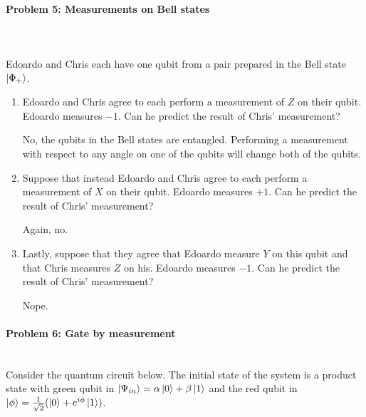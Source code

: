 \documentclass[12pt]{article}
\newcommand{\rsqrt}[1]{\ensuremath{\frac{1}{\sqrt{#1}}}}
\newenvironment{answer}{\begingroup\setlength{\leftskip}{-\leftmargin}\begin{framed}}{\end{framed}\endgroup}
\begin{document}
\paragraph{Problem 5: Measurements on Bell states} \hfill \\ \hfill \\

Edoardo and Chris each have one qubit from a pair prepared in the Bell state $\ket{\Phi_+}$.

\begin{enumerate}
    \item Edoardo and Chris agree to each perform a measurement of $Z$ on their qubit. Edoardo measures $-1$. Can he predict the result of Chris' measurement?

    \begin{answer}
        No, the qubits in the Bell states are entangled. Performing a measurement with respect to any angle on one of the qubits will change both of the qubits.
    \end{answer}

    \item Suppose that instead Edoardo and Chris agree to each perform a measurement of $X$ on their qubit. Edoardo measures $+1$. Can he predict the result of Chris' measurement?

    \begin{answer}
        Again, no.
    \end{answer}

    \item Lastly, suppose that they agree that Edoardo measure $Y$ on this qubit and that Chris measures $Z$ on his. Edoardo measures $-1$. Can he predict the result of Chris' measurement?

    \begin{answer}
        Nope.
    \end{answer}
\end{enumerate}

\paragraph{Problem 6: Gate by measurement} \hfill \\

Consider the quantum circuit below. The initial state of the system is a product state with green qubit in $\ket{\Psi_{in}} = \alpha\ket{0} + \beta\ket{1}$ and the red qubit in $\ket{\phi} = \rsqrt{2} (\ket{0} + e^{i\phi}\ket{1})$.
\end{document}
